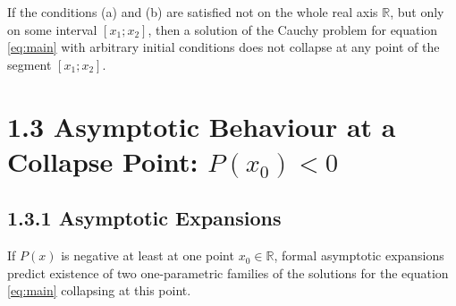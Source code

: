 \begin{corollary}
	If the conditions (a) and (b) are satisfied not on the whole real axis $\mathbb{R}$, but only on some interval $[x_1; x_2]$, then a solution of the Cauchy problem for equation \eqref{eq:main} with arbitrary initial conditions does not collapse at any point of the segment $[x_1; x_2]$.
\end{corollary}

\section*{1.3 Asymptotic Behaviour at a Collapse Point: $P(x_0) < 0$}

\subsection*{1.3.1 Asymptotic Expansions}

If $P(x)$ is negative at least at one point $x_0 \in \mathbb{R}$, formal asymptotic expansions predict existence of two one-parametric families of the solutions for the equation \eqref{eq:main} collapsing at this point.

